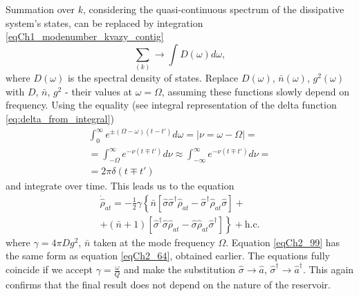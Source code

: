 Summation over $k$, considering the quasi-continuous spectrum of the dissipative system's states, can be replaced by integration
\eqref{eqCh1_modenumber_kvazy_contig}
\[
\sum_{(k)} \rightarrow \int D\left(\omega\right)d \omega,
\]  
where $D\left(\omega\right)$ is the spectral density of states. Replace $D\left(\omega\right)$, $\bar{n}\left(\omega\right)$, $g^2\left(\omega\right)$ with $D$, $\bar{n}$, $g^2$ - their values at $\omega = \Omega$, assuming these functions slowly depend on frequency. Using the equality (see integral representation of the delta function \eqref{eq:delta_from_integral})
\begin{eqnarray}
\int_{0}^\infty
e^{\pm\left(\Omega - \omega\right)
\left(t - t'\right)}d \omega = \left|\nu = \omega - \Omega\right| =
\nonumber \\
=
\int_{-\Omega}^\infty
e^{ - \nu
\left(t \mp t'\right)}d \nu \approx
\int_{-\infty}^\infty
e^{ - \nu
\left(t \mp t'\right)}d \nu = 
\nonumber \\
= 2 \pi \delta \left(t \mp t'\right) 
\label{eqCh2_98}
\end{eqnarray}
and integrate over time. This leads us to the equation 
\begin{eqnarray}
\dot{\hat{\rho}}_{at} = -\frac{1}{2}\gamma \left\{
\bar{n}\left[
\hat{\sigma}\hat{\sigma}^{\dag}\hat{\rho}_{at} -
\hat{\sigma}^{\dag}\hat{\rho}_{at}\hat{\sigma}
\right] +
\right.
\nonumber \\
+
\left.
\left(\bar{n} + 1\right)\left[
\hat{\sigma}^{\dag}\hat{\sigma}\hat{\rho}_{at} -
\hat{\sigma}\hat{\rho}_{at}\hat{\sigma}^{\dag}
\right]
\right\}
+ \mbox{h.c.}
\label{eqCh2_99}
\end{eqnarray}
where $\gamma =4 \pi D g^2$, $\bar{n}$ taken at the mode frequency $\Omega$. Equation \eqref{eqCh2_99} has the same form as equation \eqref{eqCh2_64}, obtained earlier. The equations fully coincide if we accept $\gamma = \frac{\omega}{Q}$ and make the substitution $\hat{\sigma} \rightarrow \hat{a}$, $\hat{\sigma}^{\dag} \rightarrow \hat{a}^{\dag}$. This again confirms that the final result does not depend on the nature of the reservoir.

